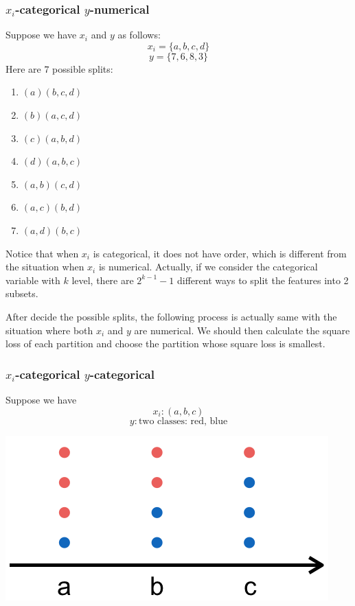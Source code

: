 \documentclass{article}
\begin{document}
{\subsubsection{$x_i$-categorical $y$-numerical}
Suppose we have $x_i$ and $y$ as follows:
	\[x_i=\{a,b,c,d\}\]
	\[y=\{7,6,8,3\}\]	
	Here are $7$ possible splits:

\begin{enumerate}
	\item \((a)(b,c,d)\)
	\item \((b)(a,c,d)\)
	\item \((c)(a,b,d)\)
    \item \((d)(a,b,c)\)
    \item \((a,b)(c,d)\)
    \item \((a,c)(b,d)\)
    \item \((a,d)(b,c)\)
	
\end{enumerate}

Notice that when $x_i$ is categorical, it does not have order, which is different from the situation when $x_i$ is numerical. Actually, if we consider the categorical variable with $k$ level, there are \(2^{k-1}-1\) different ways to split the features into 2 subsets.

After decide the possible splits, the following process is actually same with the situation where both $x_i$ and $y$ are numerical. We should then calculate the square loss of each partition and choose the partition whose square loss is smallest.

\subsubsection{$x_i$-categorical $y$-categorical}{
	Suppose we have
	\[x_i:(a,b,c)\]
	\[y:\text{two classes: red, blue}\]
	 \begin{center}
	 	\includegraphics[scale=0.65]{images/categorical.png}
	 \end{center}  
	
}}
\end{document}
